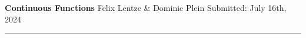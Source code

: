 \documentclass[10pt,a4paper,usenglish]{article}
\newcommand{\subject}{Continuous Functions}
\newcommand{\authors}{Felix Lentze \& Dominic Plein}
\newcommand{\submissionDate}{July 16th, 2024}
\begin{document}
\setlength{\abovedisplayskip}{0.2em}

\thispagestyle{plain} %

\vspace*{-2cm}

\begin{FlushLeft}
    \LARGE \textbf{\subject} \vspace{1mm}\linebreak
    \normalsize	\authors \vspace{1mm}\linebreak
    \small Submitted: \submissionDate

    \textcolor{heidelberg-red}{\rule{\linewidth}{1mm}}
\end{FlushLeft}

\tableofcontents
\pagebreak

\pagebreak

\pagebreak

\pagebreak

\end{document}

